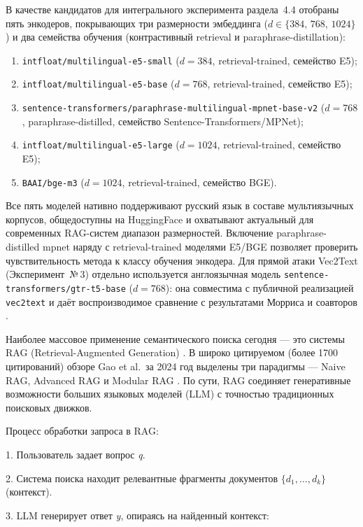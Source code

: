 \documentclass[a4paper, 12pt, oneside, openany]{article}
\begin{document}
 В качестве кандидатов для интегрального эксперимента раздела~4.4 отобраны пять энкодеров, покрывающих три размерности эмбеддинга ($d \in \{384,\,768,\,1024\}$) и два семейства обучения (контрастивный retrieval и paraphrase-distillation):
\begin{enumerate}
	\item \texttt{intfloat/multilingual-e5-small} ($d = 384$, retrieval-trained, семейство E5);
	\item \texttt{intfloat/multilingual-e5-base} ($d = 768$, retrieval-trained, семейство E5);
	\item \texttt{sentence-transformers/paraphrase-multilingual-mpnet-base-v2} ($d = 768$, paraphrase-distilled, семейство Sentence-Transformers/MPNet);
	\item \texttt{intfloat/multilingual-e5-large} ($d = 1024$, retrieval-trained, семейство E5);
	\item \texttt{BAAI/bge-m3} ($d = 1024$, retrieval-trained, семейство BGE).
\end{enumerate}

Все пять моделей нативно поддерживают русский язык в составе мультиязычных корпусов, общедоступны на HuggingFace и охватывают актуальный для современных RAG-систем диапазон размерностей. Включение paraphrase-distilled mpnet наряду с retrieval-trained моделями E5/BGE позволяет проверить чувствительность метода к классу обучения энкодера. Для прямой атаки Vec2Text (Эксперимент~№\,3) отдельно используется англоязычная модель \texttt{sentence-transformers/gtr-t5-base} ($d = 768$): она совместима с публичной реализацией \texttt{vec2text} и даёт воспроизводимое сравнение с результатами Морриса и соавторов \cite{ref5}.

Наиболее массовое применение семантического поиска сегодня — это системы RAG (Retrieval-Augmented Generation) \cite{ref10}. В широко цитируемом (более 1700 цитирований) обзоре Gao et al.\ за 2024 год выделены три парадигмы — Naive RAG, Advanced RAG и Modular RAG \cite{ref39}. По сути, RAG соединяет генеративные возможности больших языковых моделей (LLM) с точностью традиционных поисковых движков.

Процесс обработки запроса в RAG:

1. Пользователь задает вопрос \emph{q}.

2. Система поиска находит релевантные фрагменты документов $\{d_1, \ldots, d_k\}$ (контекст).

3. LLM генерирует ответ \emph{y}, опираясь на найденный контекст:
\end{document}

